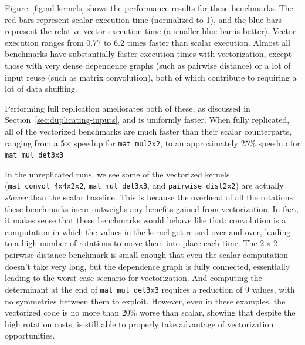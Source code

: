 Figure~\ref{fig:ml-kernels} shows the performance results for these benchmarks.
The red bars represent scalar execution time (normalized to 1), and the blue bars represent the relative vector execution time (a smaller blue bar is better).
Vector execution ranges from 0.77 to 6.2 times faster than scalar execution.
Almost all benchmarks have substantially faster execution times with vectorization, except those with very dense dependence graphs (such as pairwise distance) or a lot of input reuse (such as matrix convolution), both of which contribute to requiring a lot of data shuffling.


Performing full replication ameliorates both of these, as discussed in Section~\ref{sec:duplicating-inputs}, and is uniformly faster.
When fully replicated, all of the vectorized benchmarks are much faster than their scalar counterparts, ranging from a 5$\times$ speedup for \texttt{mat\-\_mul2x2}, to an approximately $25\%$ speedup for \texttt{mat\-\_mul\-\_det3x3}

In the unreplicated runs, we see some of the vectorized kernels (\texttt{mat\-\_convol\-\_4x4x2x2}, \texttt{mat\-\_mul\-\_det3x3}, and \texttt{pair\-wise\-\_dist2x2}) are actually {\em slower} than the scalar baseline.
This is because the overhead of all the rotations these benchmarks incur outweighs any benefits gained from vectorization.
In fact, it makes sense that these benchmarks would behave like that: convolution is a computation in which the values in the kernel get reused over and over, leading to a high number of rotations to move them into place each time.
The $2\times 2$ pairwise distance benchmark is small enough that even the scalar computation doesn't take very long, but the dependence graph is fully connected, essentially leading to the worst case scenario for vectorization.
And computing the determinant at the end of \texttt{mat\_mul\_det3x3} requires a reduction of 9 values, with no symmetries between them to exploit.
However, even in these examples, the vectorized code is no more than 20\% worse than scalar, showing that despite the high rotation costs, \system is still able to properly take advantage of vectorization opportunities.

